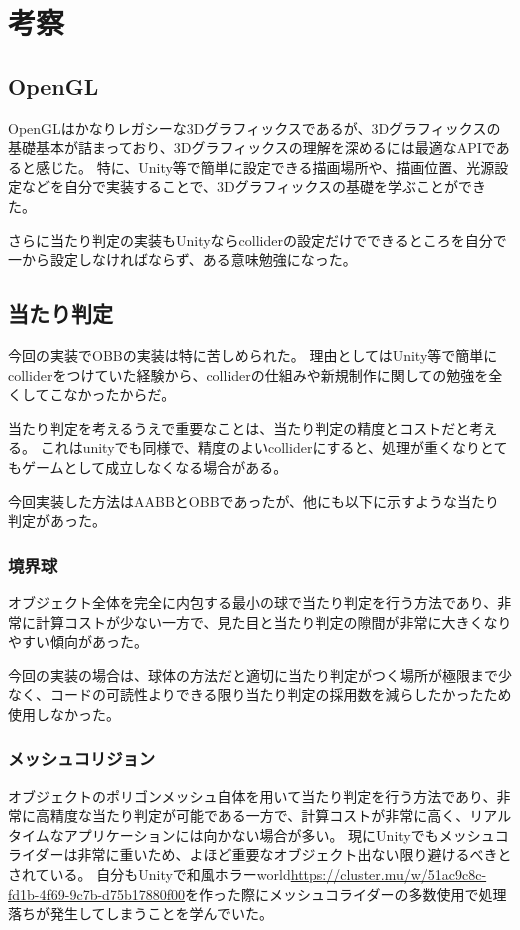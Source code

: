\documentclass[uplatex,dvipdfmx,a4paper]{jsarticle}
\begin{document}
\section{考察}
\subsection{OpenGL}
OpenGLはかなりレガシーな3Dグラフィックスであるが、3Dグラフィックスの基礎基本が詰まっており、3Dグラフィックスの理解を深めるには最適なAPIであると感じた。
特に、Unity等で簡単に設定できる描画場所や、描画位置、光源設定などを自分で実装することで、3Dグラフィックスの基礎を学ぶことができた。

さらに当たり判定の実装もUnityならcolliderの設定だけでできるところを自分で一から設定しなければならず、ある意味勉強になった。

\subsection{当たり判定}
今回の実装でOBBの実装は特に苦しめられた。
理由としてはUnity等で簡単にcolliderをつけていた経験から、colliderの仕組みや新規制作に関しての勉強を全くしてこなかったからだ。

当たり判定を考えるうえで重要なことは、当たり判定の精度とコストだと考える。
これはunityでも同様で、精度のよいcolliderにすると、処理が重くなりとてもゲームとして成立しなくなる場合がある。

今回実装した方法はAABBとOBBであったが、他にも以下に示すような当たり判定があった。
\subsubsection{境界球}
オブジェクト全体を完全に内包する最小の球で当たり判定を行う方法であり、非常に計算コストが少ない一方で、見た目と当たり判定の隙間が非常に大きくなりやすい傾向があった。

今回の実装の場合は、球体の方法だと適切に当たり判定がつく場所が極限まで少なく、コードの可読性よりできる限り当たり判定の採用数を減らしたかったため使用しなかった。

\subsubsection{メッシュコリジョン}
オブジェクトのポリゴンメッシュ自体を用いて当たり判定を行う方法であり、非常に高精度な当たり判定が可能である一方で、計算コストが非常に高く、リアルタイムなアプリケーションには向かない場合が多い。
現にUnityでもメッシュコライダーは非常に重いため、よほど重要なオブジェクト出ない限り避けるべきとされている。
自分もUnityで和風ホラーworld\url{https://cluster.mu/w/51ac9c8c-fd1b-4f69-9c7b-d75b17880f00}を作った際にメッシュコライダーの多数使用で処理落ちが発生してしまうことを学んでいた。
\end{document}
